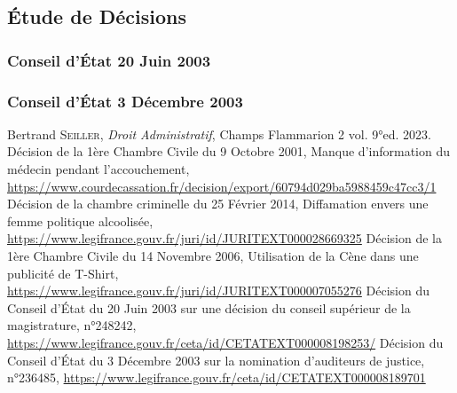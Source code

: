 \documentclass[math]{cours}
\begin{document}
\subsection{Étude de Décisions}
\subsubsection{Conseil d'État 20 Juin 2003}
\cite{CE20062003}

\subsubsection{Conseil d'État 3 Décembre 2003}
\cite{CE03122003}


\begin{thebibliography}{255}
		Bertrand \textsc{Seiller}, \textit{Droit Administratif}, Champs Flammarion 2 vol. 9°ed. 2023.
		Décision de la 1ère Chambre Civile du 9 Octobre 2001, Manque d'information du médecin pendant l'accouchement,\\
		\url{https://www.courdecassation.fr/decision/export/60794d029ba5988459c47cc3/1}
		Décision de la chambre criminelle du 25 Février 2014, Diffamation envers une femme politique alcoolisée,\\
		\url{https://www.legifrance.gouv.fr/juri/id/JURITEXT000028669325}
		Décision de la 1ère Chambre Civile du 14 Novembre 2006, Utilisation de la Cène dans une publicité de T-Shirt,\\
		\url{https://www.legifrance.gouv.fr/juri/id/JURITEXT000007055276}
		Décision du Conseil d'État du 20 Juin 2003 sur une décision du conseil supérieur de la magistrature, n°248242,\\
		\url{https://www.legifrance.gouv.fr/ceta/id/CETATEXT000008198253/}
		Décision du Conseil d'État du 3 Décembre 2003 sur la nomination d'auditeurs de justice, n°236485, \url{https://www.legifrance.gouv.fr/ceta/id/CETATEXT000008189701}
\end{thebibliography}
\end{document}
